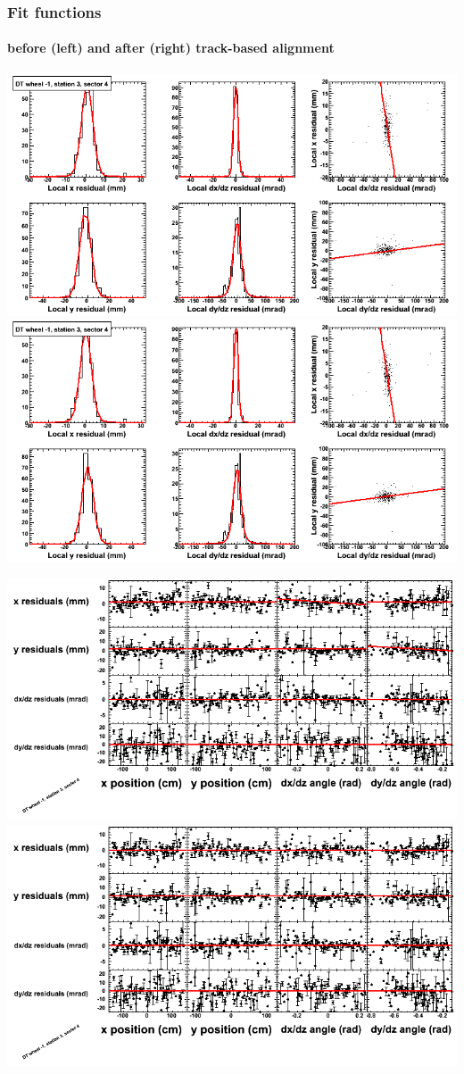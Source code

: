 \documentclass[compress]{beamer}
\begin{document}
\begin{frame}
\frametitle{Fit functions}
\framesubtitle{before (left) and after (right) track-based alignment}
\includegraphics[width=0.5\linewidth]{fitfunctions_re01/MBwhBst3sec04_bellcurves.png} \includegraphics[width=0.5\linewidth]{fitfunctions_re05/MBwhBst3sec04_bellcurves.png}

\includegraphics[width=0.5\linewidth]{fitfunctions_re01/MBwhBst3sec04_polynomials.png} \includegraphics[width=0.5\linewidth]{fitfunctions_re05/MBwhBst3sec04_polynomials.png}
\end{frame}
\end{document}

